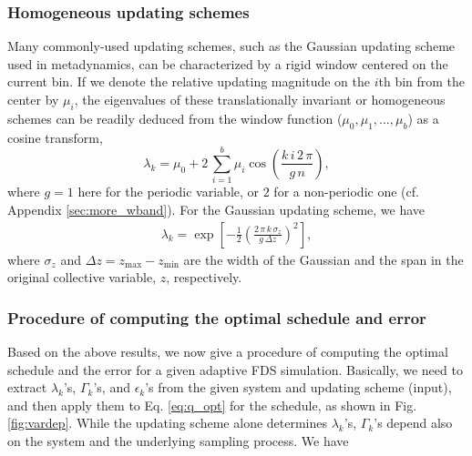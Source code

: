 \documentclass[preprint, superscriptaddress, floatfix]{revtex4-1}
\begin{document}
\subsubsection{\label{sec:band-matrix}
Homogeneous updating schemes}



Many commonly-used updating schemes,
such as the Gaussian updating scheme
used in metadynamics,
can be characterized by a rigid window
centered on the current bin.
%
If we denote the relative updating magnitude on
the $i$th bin from the center by $\mu_i$,
the eigenvalues of these translationally invariant or homogeneous
schemes can be readily deduced
from the window function ($\mu_0, \mu_1, \dots, \mu_b$)
as a cosine transform,
%
\begin{equation}
  \lambda_k
  =
  \mu_0
  +
  2 \,
  \sum_{ i = 1 }^b
  \mu_i
  \cos\left(
  \frac{ k \, i \, 2 \, \pi }
       {      g \, n        }
  \right)
  ,
  \label{eq:wband_eigenvalue}
\end{equation}
%
where $g = 1$ here for the periodic variable,
or $2$ for a non-periodic one
(cf. Appendix \ref{sec:more_wband}).
%
For the Gaussian updating scheme,
we have\cite{bussi2006}
\begin{align}
  \lambda_k
  =
  \exp\left[
        -\frac 1 2
        \left(
         \frac{ 2 \, \pi \, k \, \sigma_z }
              { g \, \Delta z  }
        \right)^2
      \right]
  ,
\label{eq:lambda_Gaussian}
\end{align}
where $\sigma_z$ and $\Delta z = z_{\max} - z_{\min}$
are the width of the Gaussian and the span
in the original collective variable, $z$,
respectively.


\subsubsection{\label{sec:procedure}
Procedure of computing the optimal schedule and error
}


Based on the above results,
we now give a procedure of computing
the optimal schedule and the error
for a given adaptive FDS simulation.
%
Basically, we need to extract
$\lambda_k$'s, $\Gamma_k$'s, and $\epsilon_k$'s
from the given system and updating scheme (input),
and then apply them to Eq. \eqref{eq:q_opt}
for the schedule,
as shown in Fig. \ref{fig:vardep}.
%
While the updating scheme alone
determines $\lambda_k$'s,
$\Gamma_k$'s depend also on the system
and the underlying sampling process.
%
We have
\end{document}
